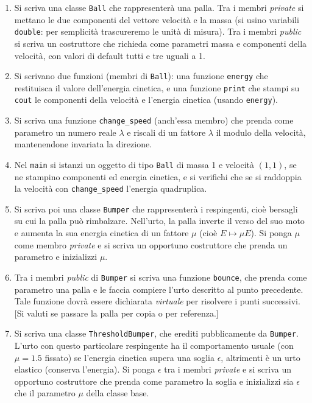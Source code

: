 \documentclass[12pt,italian]{article}
\begin{document}
\begin{enumerate}

\item
Si scriva una classe {\tt Ball} che rappresenter\`a una palla.
Tra i membri \emph{private} si mettano le due componenti del vettore velocit\`a 
e la massa (si usino variabili {\tt double}: per semplicit\`a trascureremo le unit\`a di misura).
Tra i membri \emph{public} si scriva un costruttore
che richieda come parametri massa e componenti della velocit\`a,
con valori di default tutti e tre uguali a 1.


\item
Si scrivano due funzioni (membri di {\tt Ball}): 
una funzione {\tt energy}
che restituisca il valore dell'energia cinetica,
e una funzione {\tt print}
che stampi su {\tt cout} le componenti della velocit\`a
e l'energia cinetica (usando {\tt energy}).

\item
Si scriva una funzione {\tt change\_speed} (anch'essa membro)
che prenda come parametro
un numero reale $\lambda$ e riscali di un fattore $\lambda$ il modulo della velocit\`a, 
mantenendone invariata la direzione.

\item
Nel {\tt main} si istanzi un oggetto di tipo {\tt Ball} di massa 1 e velocit\`a $(1,1)$,
se ne stampino componenti ed energia cinetica,
e si verifichi che se si raddoppia la velocit\`a con {\tt change\_speed}
l'energia quadruplica.

\item
Si scriva poi una classe {\tt Bumper} che rappresenter\`a
i respingenti, cio\`e bersagli su cui la palla pu\`o rimbalzare.
Nell'urto, la palla inverte il verso del suo moto e aumenta la sua
energia cinetica di un fattore $\mu$ (cio\`e $E\mapsto \mu E$).
Si ponga $\mu$ come membro \emph{private} e si scriva
un opportuno costruttore che prenda un parametro e inizializzi $\mu$.

\item
Tra i membri \emph{public} di {\tt Bumper} si scriva una funzione
{\tt bounce}, che prenda come parametro una palla e le faccia compiere
l'urto descritto al punto precedente.
Tale funzione dovr\`a essere dichiarata \emph{virtuale}
per risolvere i punti successivi.
[Si valuti se passare la palla per copia o per referenza.]

\item
Si scriva una classe {\tt ThresholdBumper}, che erediti pubblicamente
da {\tt Bumper}. L'urto con questo particolare respingente ha il comportamento
usuale (con $\mu=1.5$ fissato) se l'energia cinetica supera una soglia $\epsilon$, altrimenti \`e
un urto elastico (conserva l'energia). 
Si ponga $\epsilon$ tra i membri \emph{private}
e si scriva un opportuno costruttore che prenda come parametro la soglia e
inizializzi sia $\epsilon$ che il parametro $\mu$ della classe base.


\end{enumerate}
\end{document}

